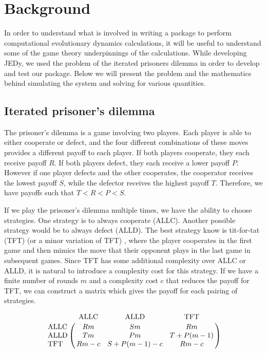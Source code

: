 \section{Background}

In order to understand what is involved in writing a package to perform computational evolutionary dynamics calculations, it will be useful to understand some of the game theory underpinnings of the calculations.
While developing JEDy, we used the problem of the iterated prisoners dilemma in order to develop and test our package.
Below we will present the problem and the mathematics behind simulating the system and solving for various quantities.

\subsection{Iterated prisoner's dilemma}

The prisoner's dilemma is a game involving two players.
Each player is able to either cooperate or defect, and the four different combinations of these moves provides a different payoff to each player.
If both players cooperate, they each receive payoff $R$.
If both players defect, they each receive a lower payoff $P$.
However if one player defects and the other cooperates, the cooperator receives the lowest payoff $S$, while the defector receives the highest payoff $T$.
Therefore, we have payoffs such that $T < R < P < S$.

If we play the prisoner's dilemma multiple times, we have the ability to choose strategies.
One strategy is to always cooperate (ALLC).
Another possible strategy would be to always defect (ALLD).
The best strategy know is tit-for-tat (TFT) (or a minor variation of TFT) \cite{nowaksigmund93}, where the player cooperates in the first game and then mimics the move that their opponent plays in the last game in subsequent games.
Since TFT has some additional complexity over ALLC or ALLD, it is natural to introduce a complexity cost for this strategy.
If we have a finite number of rounds $m$ and a complexity cost $c$ that reduces the payoff for TFT, we can construct a matrix which gives the payoff for each pairing of strategies.

\begin{equation*}
    \bordermatrix{
        ~ & \text{ALLC} & \text{ALLD} & \text{TFT} \cr
        \text{ALLC} & Rm & Sm & Rm \cr
        \text{ALLD} & Tm & Pm & T + P(m - 1) \cr
        \text{TFT} & Rm - c & S + P(m-1) - c & Rm - c \cr
    }
\end{equation*}

